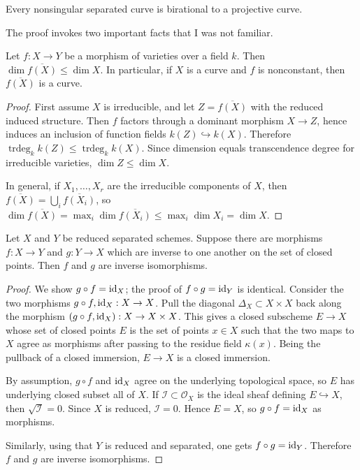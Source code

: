 \documentclass[12pt]{article}
\begin{document}
\begin{corollary}
    Every nonsingular separated curve is birational to a projective curve.
\end{corollary}

\begin{remark}
    The proof invokes two important facts that I was not familiar.

    Let $f:X\to Y$ be a morphism of varieties over a field $k$. Then $\dim \overline{f(X)}\leq \dim X$. In particular, if $X$ is a curve and $f$ is nonconstant, then $\overline{f(X)}$ is a curve.


    \begin{proof}
        First assume $X$ is irreducible, and let $Z=\overline{f(X)}$ with the reduced induced structure. Then $f$ factors through a dominant morphism $X\to Z$, hence induces an inclusion of function fields $k(Z)\hookrightarrow k(X)$. Therefore $\operatorname{trdeg}_k k(Z)\leq \operatorname{trdeg}_k k(X)$. Since dimension equals transcendence degree for irreducible varieties, $\dim Z\leq \dim X$.

        In general, if $X_1,\dots,X_r$ are the irreducible components of $X$, then $\overline{f(X)}=\bigcup_i \overline{f(X_i)}$, so $\dim \overline{f(X)}=\max_i \dim \overline{f(X_i)}\leq \max_i\dim X_i=\dim X$. \qedhere
    \end{proof}

    Let $X$ and $Y$ be reduced separated schemes. Suppose there are morphisms $f:X\to Y$ and $g:Y\to X$ which are inverse to one another on the set of closed points. Then $f$ and $g$ are inverse isomorphisms.
    \begin{proof}
        We show $g\circ f=\operatorname{id}_X$; the proof of $f\circ g=\operatorname{id}_Y$ is identical. Consider the two morphisms $g\circ f,\operatorname{id}_X:X\to X$.
        Pull the diagonal $\Delta_X\subset X\times X$ back along the morphism $(g\circ f,\operatorname{id}_X):X\to X\times X$. This gives a closed subscheme $E \to X$ whose set of closed points $E$ is the set of points $x\in X$ such that  the two maps to $X$ agree as morphisms after passing to the residue field $\kappa(x)$. Being the pullback of a closed immersion, $E\to X$ is a closed immersion.

        By assumption, $g\circ f$ and $\operatorname{id}_X$ agree on the underlying topological space, so $E$ has underlying closed subset all of $X$. If $\mathcal I\subset \mathcal O_X$ is the ideal sheaf defining $E\hookrightarrow X$, then $\sqrt{\mathcal I}=0$. Since $X$ is reduced, $\mathcal I=0$. Hence $E=X$, so $g\circ f=\operatorname{id}_X$ as morphisms.

        Similarly, using that $Y$ is reduced and separated, one gets $f\circ g=\operatorname{id}_Y$. Therefore $f$ and $g$ are inverse isomorphisms. \qedhere
    \end{proof}
\end{remark}
\end{document}
